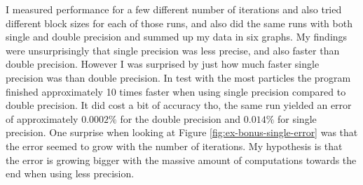 \documentclass[a4paper, 12pt]{article}
\def\f#1{Figure \ref{fig:#1}}
\begin{document}



I measured performance for a few different number of iterations and also tried different block sizes for each of those runs, and also did the same runs with both single and double precision and summed up my data in six graphs. My findings were unsurprisingly that single precision was less precise, and also faster than double precision. However I was surprised by just how much faster single precision was than double precision. In test with the most particles the program finished approximately 10 times faster when using single precision compared to double precision. It did cost a bit of accuracy tho, the same run yielded an error of approximately $0.0002\%$ for the double precision and $0.014\%$ for single precision. One surprise when looking at \f{ex-bonus-single-error} was that the error seemed to grow with the number of iterations. My hypothesis is that the error is growing bigger with the massive amount of computations towards the end when using less precision.

\end{document}
